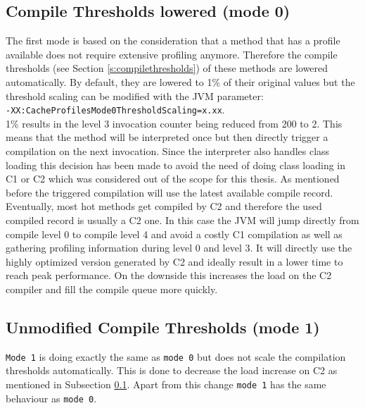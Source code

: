 \subsection{Compile Thresholds lowered (mode 0)}
\label{s:mode0}
The first mode is based on the consideration that a method that has a profile available does not require extensive profiling anymore. Therefore the compile thresholds (see Section \ref{s:compilethresholds}) of these methods are lowered automatically. By default, they are lowered to 1\% of their original values but the threshold scaling can be modified with the JVM parameter: \\\texttt{-XX:CacheProfilesMode0ThresholdScaling=x.xx}. 
\\1\% results in the level 3 invocation counter being reduced from 200 to 2. This means that the method will be interpreted once but then directly trigger a compilation on the next invocation.
Since the interpreter also handles class loading this decision has been made to avoid the need of doing class loading in C1 or C2 which was considered out of the scope for this thesis.
As mentioned before the triggered compilation will use the latest available compile record. Eventually, most hot methods get compiled by C2 and therefore the used compiled record is usually a C2 one. In this case the JVM will jump directly from compile level 0 to compile level 4 and avoid a costly C1 compilation as well as gathering profiling information during level 0 and level 3.
It will directly use the highly optimized version generated by C2 and ideally result in a lower time to reach peak performance.
On the downside this increases the load on the C2 compiler and fill the compile queue more quickly.
\subsection{Unmodified Compile Thresholds (mode 1)}
\label{s:mode1}
\texttt{Mode 1} is doing exactly the same as \texttt{mode 0} but does not scale the compilation thresholds automatically.
This is done to decrease the load increase on C2 as mentioned in Subsection \ref{s:mode0}.
Apart from this change \texttt{mode 1} has the same behaviour as \texttt{mode 0}.
